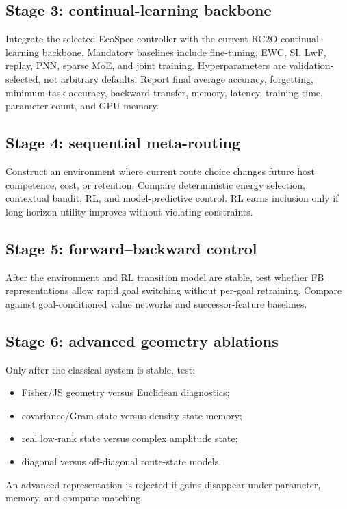 \documentclass[10pt]{article}
\begin{document}
\subsection{Stage 3: continual-learning backbone}

Integrate the selected EcoSpec controller with the current RC2O continual-learning backbone. Mandatory baselines include fine-tuning, EWC, SI, LwF, replay, PNN, sparse MoE, and joint training. Hyperparameters are validation-selected, not arbitrary defaults. Report final average accuracy, forgetting, minimum-task accuracy, backward transfer, memory, latency, training time, parameter count, and GPU memory.

\subsection{Stage 4: sequential meta-routing}

Construct an environment where current route choice changes future host competence, cost, or retention. Compare deterministic energy selection, contextual bandit, RL, and model-predictive control. RL earns inclusion only if long-horizon utility improves without violating constraints.

\subsection{Stage 5: forward--backward control}

After the environment and RL transition model are stable, test whether FB representations allow rapid goal switching without per-goal retraining. Compare against goal-conditioned value networks and successor-feature baselines.

\subsection{Stage 6: advanced geometry ablations}

Only after the classical system is stable, test:
\begin{itemize}
  \item Fisher/JS geometry versus Euclidean diagnostics;
  \item covariance/Gram state versus density-state memory;
  \item real low-rank state versus complex amplitude state;
  \item diagonal versus off-diagonal route-state models.
\end{itemize}
An advanced representation is rejected if gains disappear under parameter, memory, and compute matching.
\end{document}
